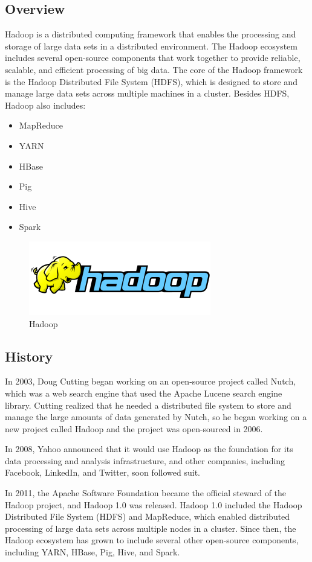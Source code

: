 \documentclass[12pt]{article}
\begin{document}
\subsection{Overview}
Hadoop is a distributed computing framework that enables the processing and storage of large data sets in a distributed environment. The Hadoop ecosystem includes several open-source components that work together to provide reliable, scalable, and efficient processing of big data. The core of the Hadoop framework is the Hadoop Distributed File System (HDFS), which is designed to store and
manage large data sets across multiple machines in a cluster. Besides HDFS, Hadoop also includes: 
\begin{itemize}
    \item MapReduce
    \item YARN
    \item HBase
    \item Pig
    \item Hive
    \item Spark
\end{itemize} 
\begin{figure}[h!]
    \centering
    \includegraphics{images/Hadoop.png}
    \caption{Hadoop}
\end{figure}
\subsection{History}
In 2003, Doug Cutting began working on an open-source project called Nutch, which was a web search engine that used the Apache Lucene search engine library. Cutting realized that he needed a distributed file system to store and manage the large amounts of data generated by Nutch, so he began working on a new project called Hadoop and the project was open-sourced in 2006. 

In 2008, Yahoo announced that it would use Hadoop as the foundation for its data processing and analysis infrastructure, and other companies, including Facebook, LinkedIn, and Twitter, soon followed
suit. 

In 2011, the Apache Software Foundation became the official steward of the Hadoop project, and Hadoop 1.0 was released. Hadoop 1.0 included the Hadoop Distributed File System (HDFS) and MapReduce, which enabled distributed processing of large data sets across multiple nodes in a cluster. Since then, the Hadoop ecosystem has grown to include several other open-source components, including YARN, HBase, Pig, Hive, and Spark.
\end{document}
